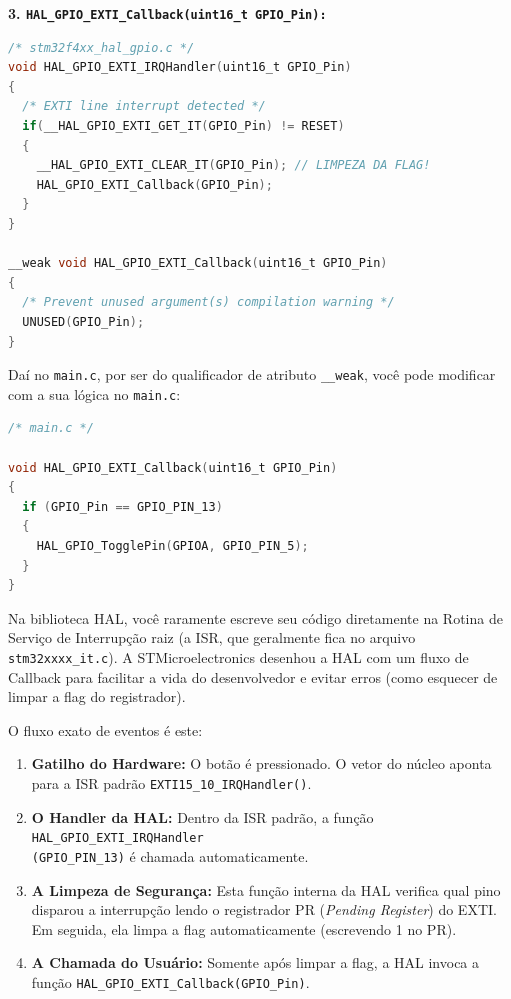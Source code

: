\documentclass[12pt,a4paper]{article}
\begin{document}
\vspace{0.3cm}
\noindent\textbf{3. \texttt{HAL\_GPIO\_EXTI\_Callback(uint16\_t GPIO\_Pin):}}
\begin{lstlisting}[language=C]
/* stm32f4xx_hal_gpio.c */
void HAL_GPIO_EXTI_IRQHandler(uint16_t GPIO_Pin)
{
  /* EXTI line interrupt detected */
  if(__HAL_GPIO_EXTI_GET_IT(GPIO_Pin) != RESET)
  {
    __HAL_GPIO_EXTI_CLEAR_IT(GPIO_Pin); // LIMPEZA DA FLAG!
    HAL_GPIO_EXTI_Callback(GPIO_Pin);
  }
}

__weak void HAL_GPIO_EXTI_Callback(uint16_t GPIO_Pin)
{
  /* Prevent unused argument(s) compilation warning */
  UNUSED(GPIO_Pin);
}
\end{lstlisting}

Daí no \texttt{main.c}, por ser do qualificador de atributo \texttt{\_\_weak}, você pode modificar com a sua lógica no \texttt{main.c}:

\begin{lstlisting}[language=C]
/* main.c */

void HAL_GPIO_EXTI_Callback(uint16_t GPIO_Pin)
{
  if (GPIO_Pin == GPIO_PIN_13)
  {
    HAL_GPIO_TogglePin(GPIOA, GPIO_PIN_5);
  }
}
\end{lstlisting}

Na biblioteca HAL, você raramente escreve seu código diretamente na Rotina de Serviço de Interrupção raiz (a ISR, que geralmente fica no arquivo \texttt{stm32xxxx\_it.c}). A STMicroelectronics desenhou a HAL com um fluxo de Callback para facilitar a vida do desenvolvedor e evitar erros (como esquecer de limpar a flag do registrador).

O fluxo exato de eventos é este:
\begin{enumerate}
    \item \textbf{Gatilho do Hardware:} O botão é pressionado. O vetor do núcleo aponta para a ISR padrão \texttt{EXTI15\_10\_IRQHandler()}.
    \item \textbf{O Handler da HAL:} Dentro da ISR padrão, a função \texttt{HAL\_GPIO\_EXTI\_IRQHandler\\(GPIO\_PIN\_13)} é chamada automaticamente.
    \item \textbf{A Limpeza de Segurança:} Esta função interna da HAL verifica qual pino disparou a interrupção lendo o registrador PR (\textit{Pending Register}) do EXTI. Em seguida, ela limpa a flag automaticamente (escrevendo 1 no PR).
    \item \textbf{A Chamada do Usuário:} Somente após limpar a flag, a HAL invoca a função \texttt{HAL\_GPIO\_EXTI\_Callback(GPIO\_Pin)}.
\end{enumerate}
\end{document}
